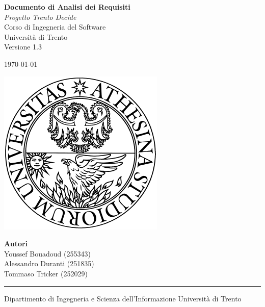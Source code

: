 \documentclass[a4paper]{report}
\begin{document}
\begin{titlepage}
  \centering

  {\Huge \bfseries Documento di Analisi dei Requisiti }\\[1.5em]
  \Large \textit{Progetto Trento Decide}\\[1em]
  \Large {Corso di Ingegneria del Software \\
Università di Trento}\\[1em]

  {\large Versione 1.3 }
  \vspace{0.5cm}

  {\large \today \par}
  \vspace{3.5cm}

  \includegraphics[width=0.33 \textwidth]{img/unitn.png}

\vfill

\begin{flushright}
  \textbf{Autori}\\[0.4em]
  Youssef Bouadoud (255343)\\
  Alessandro Duranti (251835)\\
  Tommaso Tricker (252029)
\end{flushright}

\vspace{1cm}

\hrule
\vspace{0.3em}
{\small
Dipartimento di Ingegneria e Scienza dell'Informazione
Università di Trento
}

\end{titlepage}

\tableofcontents
\newpage





\end{document}
